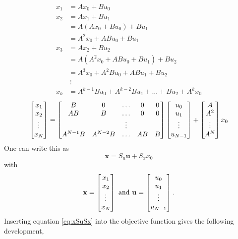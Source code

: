  \begin{equation}
     \begin{split}
         x_1 &= A x_0 + B u_0 \\
         x_2 &= Ax_1 + Bu_1 \\
             &= A(Ax_0 + Bu_0) + Bu_1 \\
             &= A^2 x_0 + AB u_0 + Bu_1\\
        x_3 &= Ax_2 + Bu_2 \\
            &= A(A^2 x_0 + ABu_0 + Bu_1) + Bu_2 \\
            &= A^3 x_0 + A^2Bu_0 + ABu_1 + Bu_2 \\
             & \: \vdots \\
        x_k &= A^{k-1}B u_{0} + A^{k-2} Bu_{1} + \hdots + B u_2 + A^k x_0
     \end{split}
 \end{equation}
 \begin{equation}
 \begin{split}
     \begin{bmatrix}x_1 \\ x_2 \\ \vdots \\ x_N \end{bmatrix} &= \begin{bmatrix}B & 0 & \hdots & 0 & 0 \\ AB & B & \hdots & 0 & 0 \\  & & \vdots & \\ A^{N-1} B & A^{N-2} B & \hdots & AB & B\end{bmatrix} \begin{bmatrix}u_0 \\ u_1 \\ \vdots \\ u_{N-1}\end{bmatrix} + \begin{bmatrix}A \\ A^2 \\ \vdots \\ A^N\end{bmatrix} x_0  \\
\end{split}     
\end{equation}
One can write this as 
\begin{equation}\label{eq:xSuSx}
    \bm x = S_u \bm u + S_x x_0 
\end{equation}
with
\begin{equation}
    \mathbf{x} = \begin{bmatrix}x_1 \\ x_2 \\ \vdots \\ x_N\end{bmatrix} \text{ and } \mathbf{u} = \begin{bmatrix}u_0 \\ u_1 \\ \vdots \\ u_{N- 1}\end{bmatrix}.
\end{equation}
Inserting equation \eqref{eq:xSuSx} into the objective function gives the following development,
